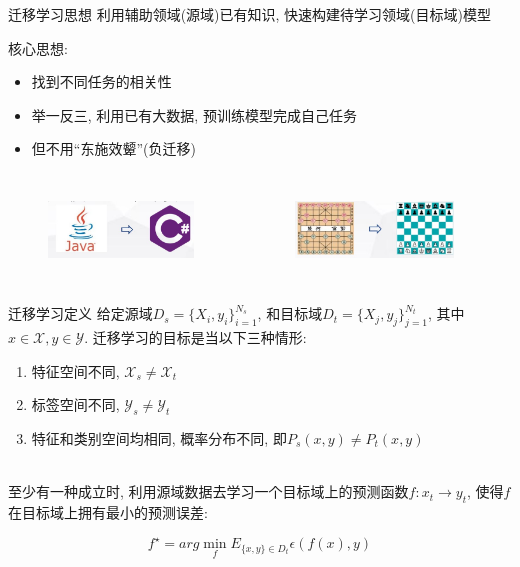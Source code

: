 \begin{frame}{迁移学习思想}
    利用辅助领域(源域)已有知识, 快速构建待学习领域(目标域)模型

    核心思想:
    \begin{itemize}
        \item 找到不同任务的相关性
        \item 举一反三, 利用已有大数据, 预训练模型完成自己任务
        \item 但不用``东施效颦''(负迁移)
    \end{itemize}

    \begin{columns}
        \begin{figure}
            \centering
            \includegraphics[height=1.5cm]{pic/pic02.jpg}
            \label{fig:02}
        \end{figure}

        \begin{figure}
            \centering
            \includegraphics[height=1.5cm]{pic/pic03.jpg}
            \label{fig:03}
        \end{figure}
    \end{columns}
\end{frame}

\begin{frame}{迁移学习定义}
    给定源域$D_{s}=\{X_{i},y_{i}\}_{i=1}^{N_{s}}$, 和目标域$D_{t}=\{X_{j},y_{j}\}_{j=1}^{N_{t}}$, 其中$x\in \mathcal{X}, y\in \mathcal{Y}$. 迁移学习的目标是当以下三种情形:\\[0.5cm]
    \begin{enumerate}
        \item 特征空间不同, $\mathcal{X}_{s} \neq \mathcal{X}_{t}$
        \item 标签空间不同, $\mathcal{Y}_{s} \neq \mathcal{Y}_{t}$
        \item 特征和类别空间均相同, 概率分布不同, 即$P_{s}(x,y)\neq P_{t}(x,y)$
    \end{enumerate}
    \hspace{1cm}\\[0.5cm]
    至少有一种成立时, 利用源域数据去学习一个目标域上的预测函数$f:x_{t} \to y_{t}$, 使得$f$在目标域上拥有最小的预测误差:

    \begin{equation*}
        f^{\star} = arg \min \limits_{f} E_{\{x,y\}\in D_{t}} \epsilon(f(x),y)
    \end{equation*}
\end{frame}


